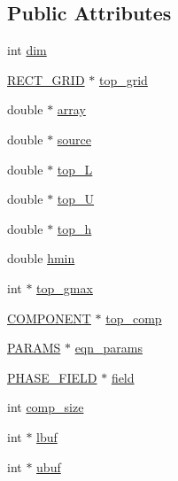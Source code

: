 \subsection*{Public Attributes}
\begin{DoxyCompactItemize}
\item 
int \hyperlink{class_v_c_a_r_t_e_s_i_a_n_a8653b3570912eeffce83c7d18c6778ed}{dim}
\item 
\hyperlink{geom_8h_a983fdb6b46c9b99969bffa62eae7d31d}{R\+E\+C\+T\+\_\+\+G\+R\+ID} $\ast$ \hyperlink{class_v_c_a_r_t_e_s_i_a_n_ada38d0ced4bcae96ad80474a504173a1}{top\+\_\+grid}
\item 
double $\ast$ \hyperlink{class_v_c_a_r_t_e_s_i_a_n_aafec08f9d4b8509ca669c2c0d971adb2}{array}
\item 
double $\ast$ \hyperlink{class_v_c_a_r_t_e_s_i_a_n_a4a33c0f88d66827b34826516105e581c}{source}
\item 
double $\ast$ \hyperlink{class_v_c_a_r_t_e_s_i_a_n_ab24253e61a340a4e101a0ad1e5c4e4f6}{top\+\_\+L}
\item 
double $\ast$ \hyperlink{class_v_c_a_r_t_e_s_i_a_n_a4e846ec8b7509e1fd52948680822c5f2}{top\+\_\+U}
\item 
double $\ast$ \hyperlink{class_v_c_a_r_t_e_s_i_a_n_a539ebf9e799de967bfe82da7ec444318}{top\+\_\+h}
\item 
double \hyperlink{class_v_c_a_r_t_e_s_i_a_n_ab6011e198e36153b0ebb218dfa8b56cf}{hmin}
\item 
int $\ast$ \hyperlink{class_v_c_a_r_t_e_s_i_a_n_a525ee1f94f500a61a3b624033afe0486}{top\+\_\+gmax}
\item 
\hyperlink{int_8h_a2bb7be12ca59ea6443c8757df0a7c278}{C\+O\+M\+P\+O\+N\+E\+NT} $\ast$ \hyperlink{class_v_c_a_r_t_e_s_i_a_n_aebb25decb0b9d468f332fda381408960}{top\+\_\+comp}
\item 
\hyperlink{climate_8h_adc32b7cd2747da3d0faff22bbba5677d}{P\+A\+R\+A\+MS} $\ast$ \hyperlink{class_v_c_a_r_t_e_s_i_a_n_a94242c33ac231ec9a2b44a05f9d7afaf}{eqn\+\_\+params}
\item 
\hyperlink{climate_8h_ac5ffc5b3bad0297c19e3d707caf86504}{P\+H\+A\+S\+E\+\_\+\+F\+I\+E\+LD} $\ast$ \hyperlink{class_v_c_a_r_t_e_s_i_a_n_aed52c2a46646288684cf8acada635fa4}{field}
\item 
int \hyperlink{class_v_c_a_r_t_e_s_i_a_n_a36f5627d08e392daf5ad8508b0fd5de6}{comp\+\_\+size}
\item 
int $\ast$ \hyperlink{class_v_c_a_r_t_e_s_i_a_n_aa7d334d6b9babde289488c8ca6e6c721}{lbuf}
\item 
int $\ast$ \hyperlink{class_v_c_a_r_t_e_s_i_a_n_a5fc6731ea8cfb532140a54f96f66490a}{ubuf}

\end{DoxyCompactItemize}
